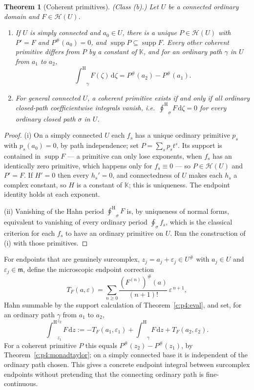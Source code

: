 \documentclass[11pt,a4paper]{article}
\numberwithin{equation}{section}
\newtheorem{theorem}{Theorem}[section]
\theoremstyle{definition}
\theoremstyle{remark}
\theoremstyle{plain}
\newcommand{\K}{\mathbb K}
\newcommand{\mm}{\mathfrak m}
\DeclareMathOperator{\supp}{supp}
\newcommand{\tm}{t}
\newcommand{\halo}[1]{#1^{\#}}
\newcommand{\ev}[1]{#1^{\#}}
\newcommand{\Hc}{\mathcal H}
\newcommand{\intH}{{\int^{\mathrm H}}}
\newcommand{\ointH}{{\oint^{\mathrm H}}}
\newcommand{\dd}{\mathrm d}
\begin{document}
\begin{theorem}[Coherent primitives]\label{c:p5:primitive}
\emph{(Class (b).)} Let $U$ be a connected ordinary domain and
$F\in\Hc(U)$.
\begin{enumerate}[label=(\roman*)]
\item If $U$ is simply connected and $a_0\in U$, there is a unique
$P\in\Hc(U)$ with $P'=F$ and $\ev P(a_0)=0$, and
$\supp P\subseteq\supp F$. Every other coherent primitive differs from
$P$ by a constant of $\K$, and for an ordinary path $\gamma$ in $U$ from
$a_1$ to $a_2$,
\[
 \intH_{\gamma}F(\zeta)\,\dd\zeta=\ev P(a_2)-\ev P(a_1).
\]
\item For general connected $U$, a coherent primitive exists if and only
if all ordinary closed-path coefficientwise integrals vanish, i.e.\
$\ointH_{\sigma}F\,\dd\zeta=0$ for every ordinary closed path $\sigma$
in $U$.
\end{enumerate}
\end{theorem}

\begin{proof}
(i) On a simply connected $U$ each $f_s$ has a unique ordinary primitive
$p_s$ with $p_s(a_0)=0$, by path independence; set $P=\sum_sp_s\tm^{s}$.
Its support is contained in $\supp F$ --- a primitive can only lose
exponents, when $f_s$ has an identically zero primitive, which happens
only for $f_s\equiv0$ --- so $P\in\Hc(U)$ and $P'=F$. If $H'=0$ then
every $h_s'=0$, and connectedness of $U$ makes each $h_s$ a complex
constant, so $H$ is a constant of $\K$; this is uniqueness. The endpoint
identity holds at each exponent.

(ii) Vanishing of the Hahn period $\ointH_\sigma F$ is, by uniqueness of
normal forms, equivalent to vanishing of every ordinary period
$\oint_\sigma f_s$, which is the classical criterion for each $f_s$ to
have an ordinary primitive on $U$. Run the construction of (i) with
those primitives.
\end{proof}

For endpoints that are genuinely surcomplex, $z_j=a_j+\varepsilon_j\in
\halo U$ with $a_j\in U$ and $\varepsilon_j\in\mm$, define the
microscopic endpoint correction
\begin{equation}\label{c:p5:eq-endpointcorr}
 T_F(a,\varepsilon)
 =\sum_{n\ge0}\frac{\ev{(F^{(n)})}(a)}{(n+1)!}\,\varepsilon^{\,n+1},
\end{equation}
Hahn summable by the support calculation of Theorem~\ref{c:p4:eval}, and
set, for an ordinary path $\gamma$ from $a_1$ to $a_2$,
\begin{equation}\label{c:p5:eq-endpointintegral}
 \intH_{z_1}^{z_2}F\,\dd z
 :=-T_F(a_1,\varepsilon_1)+\intH_{\gamma}F\,\dd z
   +T_F(a_2,\varepsilon_2).
\end{equation}
For a coherent primitive $P$ this equals $\ev P(z_2)-\ev P(z_1)$, by
Theorem~\ref{c:p4:monadtaylor}; on a simply connected base it is
independent of the ordinary path chosen. This gives a concrete endpoint
integral between surcomplex endpoints without pretending that the
connecting ordinary path is fine-continuous.
\end{document}
